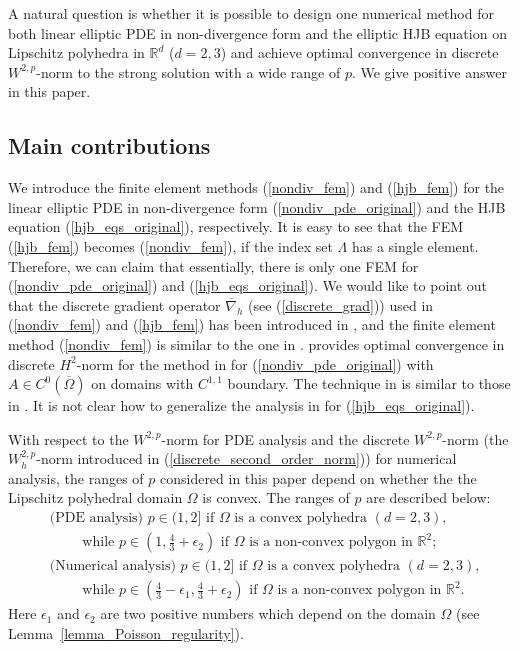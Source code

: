 \documentclass[12pt]{amsart}
\theoremstyle{definition}
\theoremstyle{remark}
\begin{document}
A natural question is whether it is possible to design one numerical method for both 
linear elliptic PDE in non-divergence form and the elliptic HJB equation on Lipschitz 
polyhedra in $\mathbb{R}^{d}$ ($d=2,3$) and achieve optimal convergence in discrete 
$W^{2,p}$-norm to the strong solution with a wide range of $p$. 
We give positive answer in this paper.

\subsection{Main contributions}

We introduce the finite element methods (\ref{nondiv_fem}) and (\ref{hjb_fem}) for 
the linear elliptic PDE in non-divergence form (\ref{nondiv_pde_original}) and 
the HJB equation (\ref{hjb_eqs_original}), respectively. It is easy to see that 
the FEM (\ref{hjb_fem}) becomes (\ref{nondiv_fem}), if the index set $\Lambda$ has 
a single element. Therefore, we can claim that essentially, there is only one 
FEM for (\ref{nondiv_pde_original}) and (\ref{hjb_eqs_original}).
We would like to point out that the discrete gradient operator $\overline{\nabla}_{h}$ 
(see (\ref{discrete_grad})) used in (\ref{nondiv_fem}) and (\ref{hjb_fem}) has been 
introduced in \cite{LakkisPryer2011}, and the finite element method (\ref{nondiv_fem}) 
is similar to the one in \cite{LakkisPryer2011}. \cite{Neilan2} provides optimal convergence 
in discrete $H^{2}$-norm for the method in \cite{LakkisPryer2011} for (\ref{nondiv_pde_original}) 
with $A\in C^{0}(\overline{\Omega})$ on domains with $C^{1,1}$ boundary. 
The technique in \cite{Neilan2} is similar to those in \cite{FHM2017,FNS1}.
It is not clear how to generalize the analysis in \cite{Neilan2} for (\ref{hjb_eqs_original}).

With respect to the $W^{2,p}$-norm for PDE analysis and the discrete $W^{2,p}$-norm (the $W_{h}^{2,p}$-norm introduced 
in (\ref{discrete_second_order_norm})) for numerical analysis, the ranges of $p$ considered in this paper depend on 
whether the the Lipschitz polyhedral domain $\Omega$ is convex. The ranges of $p$ are described below: 
\begin{subequations}
\label{p_ranges}
\begin{align}
\label{p_range1}
& \text{(PDE analysis) } p \in (1,2]  \text{ if } \Omega  \text{ is a convex polyhedra }(d=2,3), \\
\nonumber
& \qquad \text{ while } p \in (1, \frac{4}{3} + \epsilon_{2}) \text{ if } \Omega 
\text{ is a non-convex polygon in } \mathbb{R}^{2}; \\
\label{p_range2}
& \text{(Numerical analysis) } p \in (1,2]  \text{ if } \Omega  \text{ is a convex polyhedra }(d=2,3), \\
\nonumber 
& \qquad \text{ while } p \in (\frac{4}{3}-\epsilon_{1}, \frac{4}{3} + \epsilon_{2}) \text{ if } \Omega 
\text{ is a non-convex polygon in } \mathbb{R}^{2}.
\end{align}
\end{subequations}
Here $\epsilon_{1}$ and $\epsilon_{2}$ are two positive numbers which depend on the domain $\Omega$ 
(see Lemma~\ref{lemma_Poisson_regularity}). 
\end{document}
